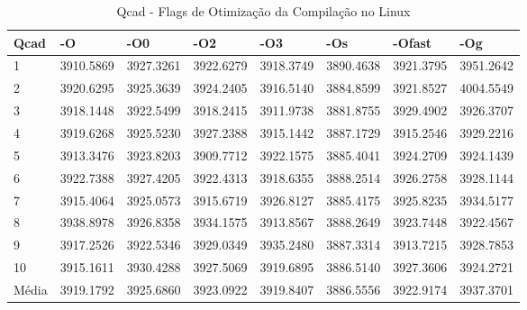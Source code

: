 \begin{table}[!ht]
\centering
\caption{Qcad - Flags de Otimização da Compilação no Linux}
\label{tab:otimizacao_compilacao:linux:qcad}
\begin{tabular}{llllllll}
\textbf{Qcad}            & \textbf{-O}  & \textbf{-O0}   & \textbf{-O2} & \textbf{-O3} & \textbf{-Os} & \textbf{-Ofast} & \textbf{-Og} \\ \toprule
1                        & 3910.5869    &  3927.3261     &  3922.6279   &   3918.3749  &   3890.4638  &    3921.3795    &   3951.2642           \\ 
2                        & 3920.6295    &  3925.3639     &  3924.2405   &   3916.5140  &   3884.8599  &    3921.8527    &   4004.5549           \\ 
3                        & 3918.1448    &  3922.5499     &  3918.2415   &   3911.9738  &   3881.8755  &    3929.4902    &   3926.3707           \\ 
4                        & 3919.6268    &  3925.5230     &  3927.2388   &   3915.1442  &   3887.1729  &    3915.2546    &   3929.2216           \\ 
5                        & 3913.3476    &  3923.8203     &  3909.7712   &   3922.1575  &   3885.4041  &    3924.2709    &   3924.1439           \\ 
6                        & 3922.7388    &  3927.4205     &  3922.4313   &   3918.6355  &   3888.2514  &    3926.2758    &   3928.1144           \\ 
7                        & 3915.4064    &  3925.0573     &  3915.6719   &   3926.8127  &   3885.4175  &    3925.8235    &   3934.5177           \\ 
8                        & 3938.8978    &  3926.8358     &  3934.1575   &   3913.8567  &   3888.2649  &    3923.7448    &   3922.4567           \\ 
9                        & 3917.2526    &  3922.5346     &  3929.0349   &   3935.2480  &   3887.3314  &    3913.7215    &   3928.7853           \\ 
10                       & 3915.1611    &  3930.4288     &  3927.5069   &   3919.6895  &   3886.5140  &    3927.3606    &   3924.2721           \\ \bottomrule
Média                    & 3919.1792    &  3925.6860     &  3923.0922   &   3919.8407  &   3886.5556  &    3922.9174    &   3937.3701           \\ 
\end{tabular}
\end{table}

